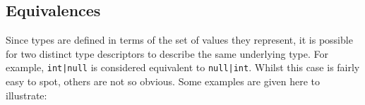

\subsection{Equivalences}
Since types are defined in terms of the set of values they represent, it is possible for two distinct type descriptors to describe the same underlying type.  For example, \lstinline{int|null} is considered equivalent to \lstinline{null|int}.  Whilst this case is fairly easy to spot, others are not so obvious.  Some examples are given here to illustrate:

